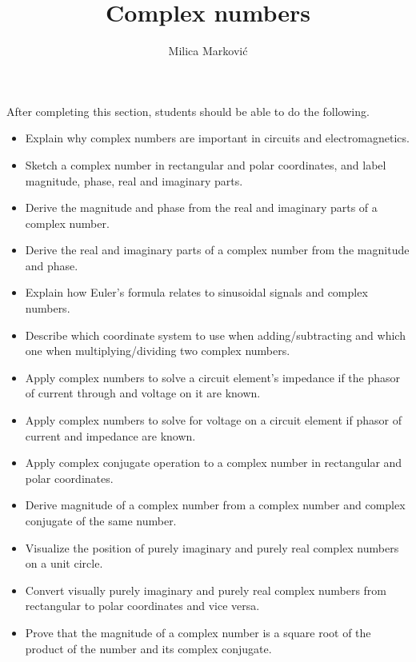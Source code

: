 \documentclass{ximera}
\title{Complex numbers}
\author{Milica Markovi{\'c}}
\begin{document}
\begin{abstract}
\end{abstract}

\maketitle

\begin{sectionOutcomes}

After completing this section, students should be able to do the following.

\begin{itemize}
\item Explain why complex numbers are important in circuits and electromagnetics.
\item Sketch a complex number in rectangular and polar coordinates, and label magnitude, phase, real and imaginary parts.
\item Derive the magnitude and phase from the real and imaginary parts of a complex number.
\item Derive the real and imaginary parts of a complex number from the magnitude and phase.
\item Explain how Euler's formula relates to sinusoidal signals and complex numbers.
\item Describe which coordinate system to use when adding/subtracting and which one when multiplying/dividing two complex numbers.
\item Apply complex numbers to solve a circuit element's impedance if the phasor of current through and voltage on it are known.
\item Apply complex numbers to solve for voltage on a circuit element if phasor of current and impedance are known.
\item Apply complex conjugate operation to a complex number in rectangular and polar coordinates.
\item Derive magnitude of a complex number from a complex number and complex conjugate of the same number.
\item Visualize the position of purely imaginary and purely real complex numbers on a unit circle.
\item Convert visually purely imaginary and purely real complex numbers from rectangular to polar coordinates and vice versa.
\item Prove that the magnitude of a complex number is a square root of the product of the number and its complex conjugate.
\end{itemize}

\end{sectionOutcomes}
\end{document}
